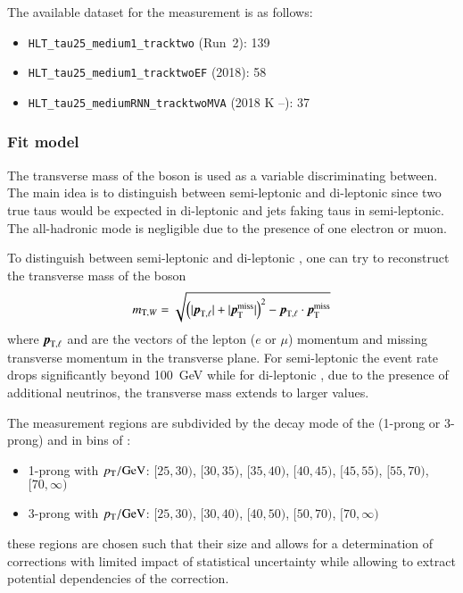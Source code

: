 The available dataset for the measurement is as follows:
\begin{itemize}

\item \verb|HLT_tau25_medium1_tracktwo| (Run~2): \SI{139}{\ifb}

\item \verb|HLT_tau25_medium1_tracktwoEF| (2018): \SI{58}{\ifb}

\item \verb|HLT_tau25_mediumRNN_tracktwoMVA| (2018 K --): \SI{37}{\ifb}

\end{itemize}



\subsubsection{Fit model}

The transverse mass of the \PW boson is used as a variable
discriminating between. The main idea is to distinguish between
semi-leptonic and di-leptonic \ttbar since two true taus would be
expected in di-leptonic and jets faking taus in semi-leptonic. The
all-hadronic mode is negligible due to the presence of one electron or
muon.

To distinguish between semi-leptonic and di-leptonic \ttbar, one can
try to reconstruct the transverse mass of the \PW boson
\begin{align*}
  \mTW = \sqrt{\left( | \myvec{p}_{\text{T}, \ell} | + | \pTmiss | \right)^2
               - \myvec{p}_{\text{T}, \ell} \cdot \pTmiss}
\end{align*}
where $\myvec{p}_{\text{T}, \ell}$ and \pTmiss are the vectors of the
lepton ($e$ or $\mu$) momentum and missing transverse momentum in the
transverse plane. For semi-leptonic \ttbar the event rate drops
significantly beyond \SI{100}{\GeV} while for di-leptonic \ttbar, due
to the presence of additional neutrinos, the transverse mass extends
to larger values.



The measurement regions are subdivided by the decay mode of the
\tauhadvis (1-prong or 3-prong) and in bins of \tauhadvis \pT:
\begin{itemize}
\item 1-prong \tauhadvis with $\pT / \si{\GeV}$: $[25, 30)$, $[30, 35)$,
  $[35, 40)$, $[40, 45)$, $[45, 55)$, $[55, 70)$, $[70, \infty)$

\item 3-prong \tauhadvis with $\pT / \si{\GeV}$: $[25, 30)$, $[30, 40)$,
  $[40, 50)$, $[50, 70)$, $[70, \infty)$
\end{itemize}
these regions are chosen such that their size and allows for a
determination of corrections with limited impact of statistical
uncertainty while allowing to extract potential \pT dependencies of
the correction.


